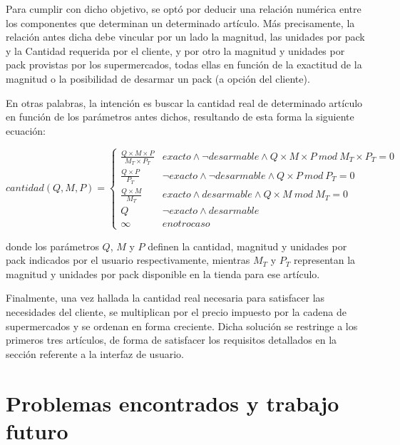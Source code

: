 \documentclass[12pt]{article} %
\begin{document}
Para cumplir con dicho objetivo, se optó por deducir una relación numérica entre los componentes que determinan un determinado artículo. Más precisamente, la relación antes dicha debe vincular por un lado la magnitud, las unidades por pack y la Cantidad requerida por el cliente, y por otro la magnitud y unidades por pack provistas por los supermercados, todas ellas en función de la exactitud de la magnitud o la posibilidad de desarmar un pack (a opción del cliente). 

En otras palabras, la intención es buscar la cantidad real de determinado artículo en función de los parámetros antes dichos, resultando de esta forma la siguiente ecuación:

\[
cantidad(Q,M,P) =
\begin{cases} 
\frac{Q\times M\times P}{M_T \times P_T} & exacto \wedge \neg desarmable \wedge Q\times M\times P\ mod\ M_T \times P_T = 0 \\ 
\frac{Q\times P}{P_T} &  \neg exacto \wedge \neg desarmable \wedge Q\times P\ mod\ P_T = 0 \\
\frac{Q\times M}{M_T} & exacto \wedge desarmable \wedge Q\times M\ mod\ M_T = 0 \\
Q & \neg exacto \wedge desarmable \\
\infty & en otro caso


\end{cases}
\] 

donde los parámetros $Q$, $M$ y $P$ definen la cantidad, magnitud y unidades por pack indicados por el usuario respectivamente, mientras $M_T$ y $P_T$ representan la magnitud y unidades por pack disponible en la tienda para ese artículo.

Finalmente, una vez hallada la cantidad real necesaria para satisfacer las necesidades del cliente, se multiplican por el precio impuesto por la cadena de supermercados y se ordenan en forma creciente. Dicha solución se restringe a los primeros tres artículos, de forma de satisfacer los requisitos detallados en la sección referente a la interfaz de usuario.


\section{Problemas encontrados y trabajo futuro}
\end{document}
